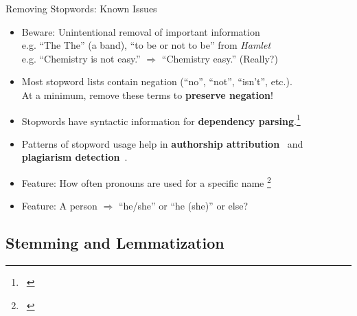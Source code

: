 \documentclass{beamer}
\renewcommand{\cite}{\citep}
\begin{document}
\begin{frame}{Removing Stopwords: Known Issues}
\begin{itemize}
\item Beware: Unintentional removal of important information\\
	e.g. ``The The'' (a band), ``to be or not to be'' from \textit{Hamlet}\\
	e.g. ``Chemistry is not easy.'' $\Rightarrow$ ``Chemistry easy.'' (Really?)
\item Most stopword lists contain negation (``no'', ``not'', ``isn't'', etc.).\\
	At a minimum, remove these terms to \textbf{preserve negation}!
	\bigskip
\item Stopwords have syntactic information for \textbf{dependency parsing}.\footnote{~\cite{elming2013down, poria2014dependency}}
\item Patterns of stopword usage help in \textbf{authorship attribution}~\cite{arun2009stopword} and \textbf{plagiarism detection}~\cite{stamatatos2011plagiarism}.
\item Feature: How often pronouns are used for a specific name \footnote{~\cite{sanchez2019paraphrase}}
\item Feature: A person $\Rightarrow$ ``he/she'' or ``he (she)'' or else?
\end{itemize}
\end{frame}

\subsection{Stemming and Lemmatization}
\end{document}
